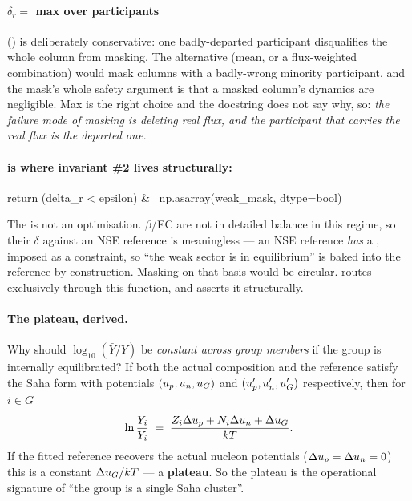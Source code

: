 \paragraph{$\delta_r =$ max over participants} () is
deliberately conservative: one badly-departed participant disqualifies the whole
column from masking. The alternative (mean, or a flux-weighted combination)
would mask columns with a badly-wrong minority participant, and the mask's whole
safety argument is that a masked column's dynamics are negligible. Max is the
right choice and the docstring does not say why, so: \emph{the failure mode of
masking is deleting real flux, and the participant that carries the real flux is
the departed one.}

\paragraph{ is where invariant \#2 lives structurally:}

\begin{srclisting}
return (delta_r < epsilon) & ~np.asarray(weak_mask, dtype=bool)
\end{srclisting}

The  is not an optimisation. $\beta$/EC are
not in detailed balance in this regime, so their $\delta$ against an NSE
reference is meaningless --- an NSE reference \emph{has} a \Ye, imposed as a
constraint, so ``the weak sector is in equilibrium'' is baked into the reference
by construction. Masking on that basis would be circular.
 routes exclusively through this
function, and  asserts it structurally.

\paragraph{The \rQSE{} plateau, derived.} Why should $\log_{10}(\bar Y/Y)$ be
\emph{constant across group members} if the group is internally equilibrated? If
both the actual composition and the reference satisfy the Saha form with
potentials $(u_{p}, u_{n}, u_{G})$ and $(u_{p}', u_{n}', u_{G}')$ respectively, then for
$i \in G$
%
\begin{equation}
\ln\frac{\bar Y_i}{Y_i} \;=\;
\frac{Z_i\Delta u_{p} + N_i\Delta u_{n} + \Delta u_{G}}{kT}.
\label{eq:plateau}
\end{equation}
%
If the fitted reference recovers the actual nucleon potentials
($\Delta u_{p} = \Delta u_{n} = 0$) this is a constant $\Delta u_{G}/kT$ --- a
\textbf{plateau}. So the plateau is the operational signature of ``the group is
a single Saha cluster''.

